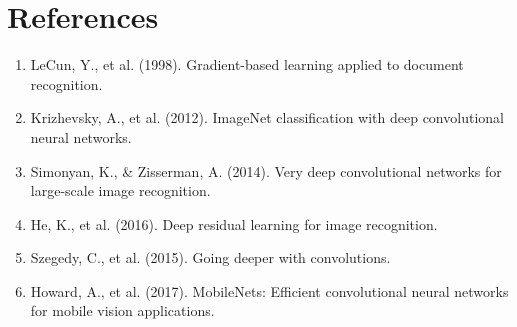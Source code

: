 \documentclass[12pt,a4paper]{article}
\begin{document}
\section{References}

\begin{enumerate}
    \item LeCun, Y., et al. (1998). Gradient-based learning applied to document recognition.
    \item Krizhevsky, A., et al. (2012). ImageNet classification with deep convolutional neural networks.
    \item Simonyan, K., \& Zisserman, A. (2014). Very deep convolutional networks for large-scale image recognition.
    \item He, K., et al. (2016). Deep residual learning for image recognition.
    \item Szegedy, C., et al. (2015). Going deeper with convolutions.
    \item Howard, A., et al. (2017). MobileNets: Efficient convolutional neural networks for mobile vision applications.
\end{enumerate}
\end{document}
